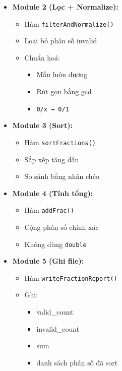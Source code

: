\begin{itemize}
\begin{itemize}
        \item \textbf{Module 2 (Lọc + Normalize):}

        \begin{itemize}
            \item Hàm \texttt{filterAndNormalize()}
            \item Loại bỏ phân số invalid
            \item Chuẩn hoá:
            \begin{itemize}
                \item Mẫu luôn dương
                \item Rút gọn bằng gcd
                \item \texttt{0/x → 0/1}
            \end{itemize}
        \end{itemize}

        \item \textbf{Module 3 (Sort):}

        \begin{itemize}
            \item Hàm \texttt{sortFractions()}
            \item Sắp xếp tăng dần
            \item So sánh bằng nhân chéo
        \end{itemize}

        \item \textbf{Module 4 (Tính tổng):}

        \begin{itemize}
            \item Hàm \texttt{addFrac()}
            \item Cộng phân số chính xác
            \item Không dùng \texttt{double}
        \end{itemize}

        \item \textbf{Module 5 (Ghi file):}

        \begin{itemize}
            \item Hàm \texttt{writeFractionReport()}
            \item Ghi:
            \begin{itemize}
                \item valid\_count
                \item invalid\_count
                \item sum
                \item danh sách phân số đã sort
            \end{itemize}
        \end{itemize}


\end{itemize}
\end{itemize}
